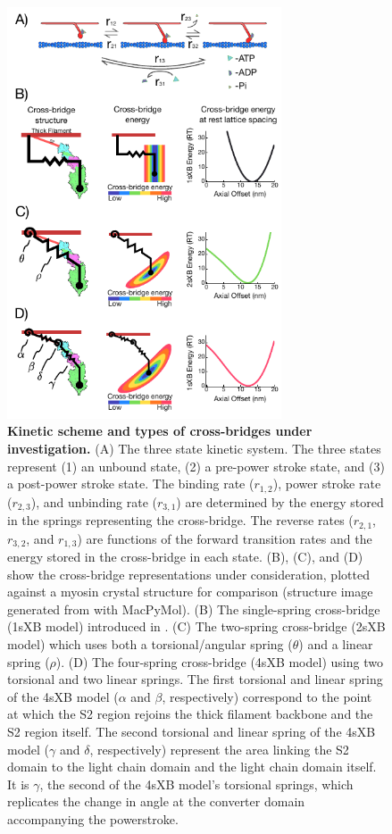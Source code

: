 \documentclass[]{article}
\begin{document}
\begin{figure}[ht]
    \begin{center}
    \includegraphics[width=3.2in]{../imgs/Figure1.pdf}
    \caption{
        \label{fig_xb_types}
        \textbf{Kinetic scheme and types of cross-bridges under investigation.} 
        (A)  The three state kinetic system.  
        The three states represent (1) an unbound state, (2) a pre-power stroke state, and (3) a post-power stroke state. 
        The binding rate ($r_{1,2}$), power stroke rate ($r_{2,3}$), and unbinding rate ($r_{3,1}$) are determined by the energy stored in the springs representing the cross-bridge. 
        The reverse rates ($r_{2,1}$, $r_{3,2}$, and $r_{1,3}$) are functions of the forward transition rates and the energy stored in the cross-bridge in each state.  
        (B), (C), and (D) show the cross-bridge representations under consideration, plotted against a myosin crystal structure for comparison (structure image generated from \citet{Gourinath2003} with MacPyMol).
        (B) The single-spring cross-bridge (1sXB model) introduced in \protect\citep{Huxley1957}. 
        (C) The two-spring cross-bridge (2sXB model) which uses both a torsional/angular spring ($\theta$) and a linear spring ($\rho$). 
        (D) The four-spring cross-bridge (4sXB model) using two torsional and two linear springs.
        The first torsional and linear spring of the 4sXB model ($\alpha$ and $\beta$, respectively) correspond to the point at which the S2 region rejoins the thick filament backbone and the S2 region itself. 
        The second torsional and linear spring of the 4sXB model ($\gamma$ and $\delta$, respectively) represent the area linking the S2 domain to the light chain domain and the light chain domain itself.
        It is $\gamma$, the second of the 4sXB model's torsional springs, which replicates the change in angle at the converter domain accompanying the powerstroke.  
    }
    \end{center}
\end{figure}
\end{document}
